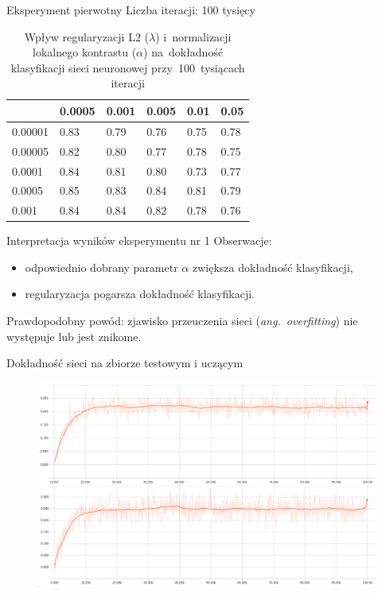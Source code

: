 \documentclass[xcolor=dvipsnames]{beamer}
\begin{document}
\begin{frame}{Eksperyment pierwotny}
Liczba iteracji: 100 tysięcy
\begin{table}[H]
    \centering
    \begin{tabular}{|l|l|l|l|l|l|}
      \hline
      \backslashbox{$\alpha$}{$\lambda$} & 0.0005 & 0.001 & 0.005 & 0.01 & 0.05 \\
      \hline
      0.00001 & 0.83 & 0.79 & 0.76 & 0.75 & 0.78 \\
      \hline
      0.00005 & 0.82 & 0.80 & 0.77 & 0.78 & 0.75 \\
      \hline
      0.0001  & 0.84 & 0.81 & 0.80 & 0.73 & 0.77 \\
      \hline
      0.0005  & 0.85 & 0.83 & 0.84 & 0.81 & 0.79 \\
      \hline
      0.001   & 0.84 & 0.84 & 0.82 & 0.78 & 0.76 \\
      \hline
    \end{tabular}
    \caption{Wpływ regularyzacji L2 ($\lambda$) i~normalizacji lokalnego kontrastu ($\alpha$) na~dokładność klasyfikacji
    sieci neuronowej przy~100~tysiącach iteracji}
    \label{table:wyniki1}
\end{table}
\end{frame}
\begin{frame}{Interpretacja wyników eksperymentu nr 1}
    Obserwacje:
    \begin{itemize}
        \item odpowiednio dobrany parametr $\alpha$ zwiększa dokładność klasyfikacji,
        \item regularyzacja pogarsza dokładność klasyfikacji.
    \end{itemize}
    \vspace{5mm}
    Prawdopodobny powód: zjawisko przeuczenia sieci (\textit{ang.~overfitting}) nie występuje lub jest znikome.
\end{frame}
\begin{frame}{Dokładność sieci na zbiorze testowym i uczącym}
  \begin{figure}
    \includegraphics[width=\textwidth]{img/badanie_1.png}
  \end{figure}
\end{frame}
\end{document}
